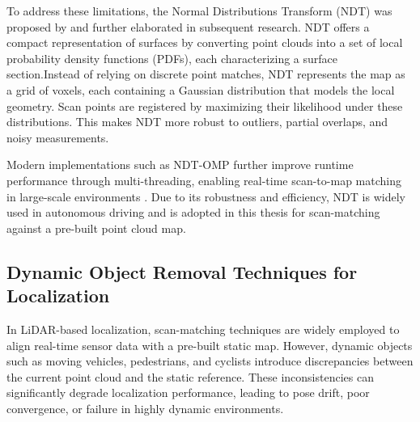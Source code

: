 To address these limitations, the Normal Distributions Transform (NDT) was proposed by \cite{biber2003ndt} and
further elaborated in subsequent research\cite{magnusson2007ndt}.  NDT offers a compact representation
of surfaces by converting point clouds into a set of local probability density functions
(PDFs), each characterizing a surface section.Instead of relying on discrete point matches, NDT represents the map as a grid of voxels, each containing a Gaussian distribution that models the local geometry. Scan points are registered by maximizing their likelihood under these distributions. This makes NDT more robust to outliers, partial overlaps, and noisy measurements.

Modern implementations such as NDT-OMP further improve runtime performance through multi-threading, enabling real-time scan-to-map matching in large-scale environments \cite{koide2019portable}. Due to its robustness and efficiency, NDT is widely used in autonomous driving and is adopted in this thesis for scan-matching against a pre-built point cloud map.

\subsection{Dynamic Object Removal Techniques for Localization}

In LiDAR-based localization, scan-matching techniques are widely employed to align real-time sensor data with a pre-built static map. However, dynamic objects such as moving vehicles, pedestrians, and cyclists introduce discrepancies between the current point cloud and the static reference. These inconsistencies can significantly degrade localization performance, leading to pose drift, poor convergence, or failure in highly dynamic environments.

